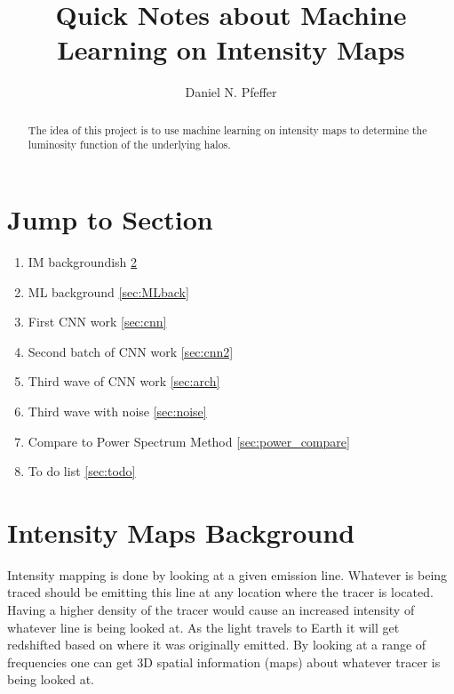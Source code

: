 \documentclass{article}
\title{Quick Notes about Machine Learning on Intensity Maps}
\author{Daniel N. Pfeffer}
\date{}
\begin{document}
% 

	\maketitle

	\begin{abstract}
		The idea of this project is to use machine learning on intensity maps to determine the luminosity function of the underlying halos.
	\end{abstract}

	\section{Jump to Section}
		\begin{enumerate}
			\item IM backgroundish \ref{sec:IMback}

			\item ML background \ref{sec:MLback}

			\item First CNN work \ref{sec:cnn}

			\item Second batch of CNN work \ref{sec:cnn2}

			\item Third wave of CNN work \ref{sec:arch}

			\item Third wave with noise \ref{sec:noise}

			\item Compare to Power Spectrum Method \ref{sec:power_compare}

			\item To do list \ref{sec:todo}
		\end{enumerate}	

	\section{Intensity Maps Background} \label{sec:IMback}

		Intensity mapping is done by looking at a given emission line.  Whatever is being traced should be emitting this line at any location where the tracer is located.  Having a higher density of the tracer would cause an increased intensity of whatever line is being looked at.  As the light travels to Earth it will get redshifted based on where it was originally emitted.  By looking at a range of frequencies one can get 3D spatial information (maps) about whatever tracer is being looked at.  
\end{document}

